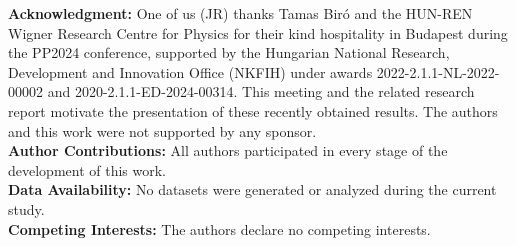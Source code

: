 \documentclass[epjST]{svjour}
\begin{document}
\noindent\textbf{Acknowledgment:} 
One of us (JR) thanks Tamas Bir\'o and the {\color{blue} HUN-REN Wigner Research Centre for Physics for their kind hospitality in Budapest during the PP2024 conference, supported by the Hungarian National Research, Development and Innovation Office (NKFIH)} under awards 2022-2.1.1-NL-2022-00002 and 2020-2.1.1-ED-2024-00314. This meeting and the related research report motivate the presentation of these recently obtained results. The authors and this work were not supported by any sponsor.\\
\textbf{Author Contributions:} All authors participated in every stage of the development of this work.\\
\textbf{Data Availability:} No datasets were generated or analyzed during the current study.\\
\textbf{Competing Interests:} The authors declare no competing interests.



\end{document}

